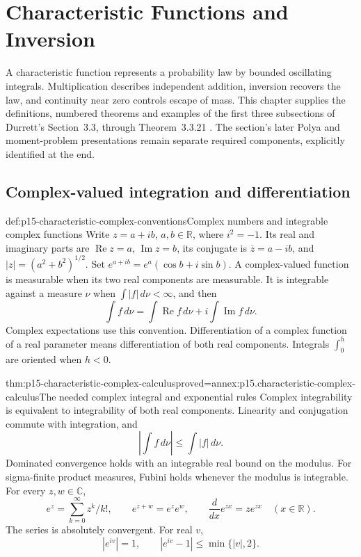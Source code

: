 \chapter{Characteristic Functions and Inversion}
\label{sec:p15-characteristic-functions-and-inversion}

A characteristic function represents a probability law by bounded
oscillating integrals. Multiplication describes independent addition,
inversion recovers the law, and continuity near zero controls escape
of mass. This chapter supplies the definitions, numbered theorems
and examples of the first three subsections of Durrett's
Section~3.3, through Theorem~3.3.21
\cite[pp.~125--136]{DurrettPTEAuthor2019}.
The section's later Polya and moment-problem presentations remain
separate required components, explicitly identified at the end.

\section{Complex-valued integration and differentiation}
\label{sec:p15-characteristic-complex-foundations}

\begin{hbdefinition}{def:p15-characteristic-complex-conventions}{Complex numbers and integrable complex functions}
Write \(z=a+ib\), \(a,b\in\mathbb R\), where \(i^2=-1\).
Its real and imaginary parts are \(\operatorname{Re}z=a\),
\(\operatorname{Im}z=b\), its conjugate is \(\overline z=a-ib\),
and \(|z|=(a^2+b^2)^{1/2}\).
Set \(e^{a+ib}=e^a(\cos b+i\sin b)\).
A complex-valued function is measurable when its two real
components are measurable. It is integrable against a measure
\(\nu\) when \(\int|f|\,d\nu<\infty\), and then
\[
 \int f\,d\nu=\int\operatorname{Re}f\,d\nu
                       +i\int\operatorname{Im}f\,d\nu.
\]
Complex expectations use this convention. Differentiation of a
complex function of a real parameter means differentiation of
both real components. Integrals \(\int_0^h\) are oriented
when \(h<0\).
\end{hbdefinition}

\begin{hblemma}{thm:p15-characteristic-complex-calculus}{proved=annex:p15.characteristic-complex-calculus}{The needed complex integral and exponential rules}
Complex integrability is equivalent to integrability of both real
components. Linearity and conjugation commute with integration, and
\[
 \left|\int f\,d\nu\right|\leq\int|f|\,d\nu.
\]
Dominated convergence holds with an integrable real bound on
the modulus. For sigma-finite product measures, Fubini holds
whenever the modulus is integrable.
For every \(z,w\in\mathbb C\),
\[
 e^z=\sum_{k=0}^\infty z^k/k!,\qquad
 e^{z+w}=e^ze^w,\qquad
 \frac{d}{dx}e^{zx}=ze^{zx}\quad(x\in\mathbb R).
\]
The series is absolutely convergent.
For real \(v\),
\[
 |e^{iv}|=1,\qquad |e^{iv}-1|\leq\min\{|v|,2\}.
\]
\end{hblemma}

